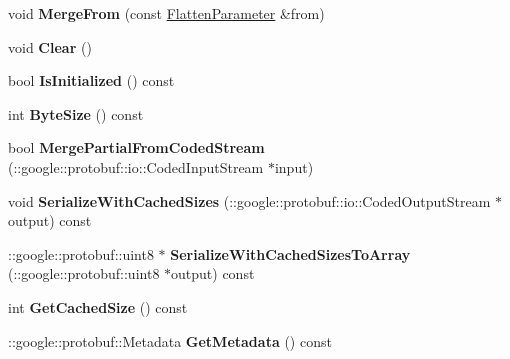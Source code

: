 \begin{DoxyCompactItemize}
\item 
\mbox{\label{classcaffe_1_1_flatten_parameter_a40b5a7d14ec519448129ba2dc6f5ab86}} 
void {\bfseries Merge\+From} (const \mbox{\hyperlink{classcaffe_1_1_flatten_parameter}{Flatten\+Parameter}} \&from)
\item 
\mbox{\label{classcaffe_1_1_flatten_parameter_a99ee269aea6609c5e45551d503e44e61}} 
void {\bfseries Clear} ()
\item 
\mbox{\label{classcaffe_1_1_flatten_parameter_ac53a68c9076709b57dec2c3f675e3808}} 
bool {\bfseries Is\+Initialized} () const
\item 
\mbox{\label{classcaffe_1_1_flatten_parameter_ae4c6f9547396228edd634f296a8073e3}} 
int {\bfseries Byte\+Size} () const
\item 
\mbox{\label{classcaffe_1_1_flatten_parameter_ac8b8e88d809df711e2c5c15ef02e7167}} 
bool {\bfseries Merge\+Partial\+From\+Coded\+Stream} (\+::google\+::protobuf\+::io\+::\+Coded\+Input\+Stream $\ast$input)
\item 
\mbox{\label{classcaffe_1_1_flatten_parameter_a9674659f645422fe173da512794afa71}} 
void {\bfseries Serialize\+With\+Cached\+Sizes} (\+::google\+::protobuf\+::io\+::\+Coded\+Output\+Stream $\ast$output) const
\item 
\mbox{\label{classcaffe_1_1_flatten_parameter_a01e294bbfdb57a3780350850786fc48e}} 
\+::google\+::protobuf\+::uint8 $\ast$ {\bfseries Serialize\+With\+Cached\+Sizes\+To\+Array} (\+::google\+::protobuf\+::uint8 $\ast$output) const
\item 
\mbox{\label{classcaffe_1_1_flatten_parameter_ab4b9ef0de5fa4b11b880137c0aa4b3d8}} 
int {\bfseries Get\+Cached\+Size} () const
\item 
\mbox{\label{classcaffe_1_1_flatten_parameter_a55e6145ae4120ea43f41037fff7ec0fd}} 
\+::google\+::protobuf\+::\+Metadata {\bfseries Get\+Metadata} () const

\end{DoxyCompactItemize}
